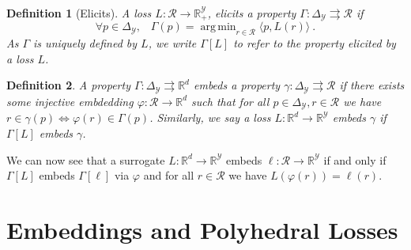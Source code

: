 \documentclass[12pt]{article}
\newcommand{\reals}{\mathbb{R}}
\newcommand{\prop}[1]{\Gamma[#1]}
\newcommand{\simplex}{\Delta_\Y}
\newcommand{\R}{\mathcal{R}}
\newcommand{\Y}{\mathcal{Y}}
\newcommand{\inprod}[2]{\langle #1, #2 \rangle}%
\newcommand{\toto}{\rightrightarrows}
\DeclareMathOperator*{\argmin}{arg\,min}
\newtheorem{definition}{Definition}
\begin{document}
\begin{definition}[Elicits]
  A loss $L:\R\to\reals^\Y_+$, \emph{elicits} a property $\Gamma:\simplex \toto \R$ if
  \begin{equation}
    \forall p\in\simplex,\;\;\;\Gamma(p) = \argmin_{r \in \R} \inprod{p}{L(r)}~.
  \end{equation}
  As $\Gamma$ is uniquely defined by $L$, we write $\prop{L}$ to refer to the property elicited by a loss $L$.
\end{definition}

\begin{definition}
  A property $\Gamma : \simplex \toto \reals^d$ \emph{embeds} a property $\gamma : \simplex \toto \R$ if there exists some injective embdedding $\varphi:\R\to\reals^d$ such that for all $p\in\simplex,r\in\R$ we have $r \in \gamma(p) \iff \varphi(r) \in \Gamma(p)$.
  Similarly, we say a loss $L:\reals^d\to\reals^\Y$ embeds $\gamma$ if $\prop{L}$ embeds $\gamma$.
\end{definition}
We can now see that a surrogate $L:\reals^d\to\reals^\Y$ embeds $\ell:\R\to\reals^\Y$ if and only if $\prop{L}$ embeds $\prop{\ell}$ via $\varphi$ and for all $r\in\R$ we have $L(\varphi(r)) = \ell(r)$.



\section{Embeddings and Polyhedral Losses}
\label{sec:poly-loss-embed}
\end{document}
